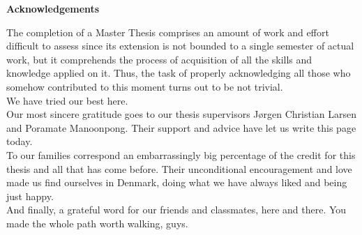 \newenvironment{acknowledgements}%
    {\null\vfill\begin{center}%
    \bfseries Acknowledgements\end{center}}%
    {\vfill\null}
        \begin{acknowledgements}
        The completion of a Master Thesis comprises an amount of work and effort difficult to assess since its extension is not bounded to a single semester of actual work, but it comprehends the process of acquisition of all the skills and knowledge applied on it.
        Thus, the task of properly acknowledging all those who somehow contributed to this moment turns out to be not trivial.\\ 
        We have tried our best here.\\
        Our most sincere gratitude goes to our thesis supervisors Jørgen Christian Larsen and Poramate Manoonpong. 
        Their support and advice have let us write this page today.\\
        To our families correspond an embarrassingly big percentage of the credit for this thesis and all that has come before. Their unconditional encouragement and love made us find ourselves in Denmark, doing what we have always liked and being just happy.\\
        And finally, a grateful word for our friends and classmates, here and there.
        You made the whole path worth walking, guys.


        \end{acknowledgements}